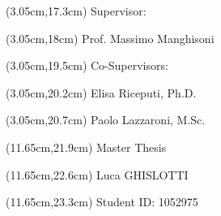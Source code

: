 \begin{textblock*}{\textwidth}(3.05cm,17.3cm) 
    Supervisor:
\end{textblock*}
\begin{textblock*}{\textwidth}(3.05cm,18cm)
    Prof. Massimo Manghisoni
\end{textblock*}

\begin{textblock*}{\textwidth}(3.05cm,19.5cm)
    Co-Supervisors:
\end{textblock*}
\begin{textblock*}{\textwidth}(3.05cm,20.2cm)
    Elisa Riceputi, Ph.D.
\end{textblock*}
\begin{textblock*}{\textwidth}(3.05cm,20.7cm) 
    Paolo Lazzaroni, M.Sc.
\end{textblock*}

\begin{textblock*}{\textwidth}(11.65cm,21.9cm)
    Master Thesis
\end{textblock*}
\begin{textblock*}{\textwidth}(11.65cm,22.6cm)
    Luca GHISLOTTI
\end{textblock*}
\begin{textblock*}{\textwidth}(11.65cm,23.3cm) 
    Student ID: 1052975
\end{textblock*}